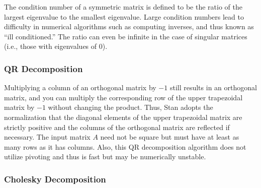 The condition number of a symmetric matrix is defined to be the ratio
of the largest eigenvalue to the smallest eigenvalue.  Large condition
numbers lead to difficulty in numerical algorithms such as computing
inverses, and thus known as ``ill conditioned.''  The ratio can even
be infinite in the case of singular matrices (i.e., those with
eigenvalues of 0).

%
%
%

\subsubsection{QR Decomposition}\label{QR-decomposition}

\begin{description}
%
%
%
\end{description}
%
Multiplying a column of an orthogonal matrix by $-1$ still results in 
an orthogonal matrix, and you can multiply the corresponding row of 
the upper trapezoidal matrix by $-1$ without changing the product. Thus,
Stan adopts the normalization that the diagonal elements of the upper
trapezoidal matrix are strictly positive and the columns of the 
orthogonal matrix are reflected if necessary. The input matrix $A$ need
not be square but must have at least as many rows as it has columns.
Also, this QR decomposition algorithm does not utilize pivoting and 
thus is fast but may be numerically unstable.

\subsubsection{Cholesky Decomposition}

